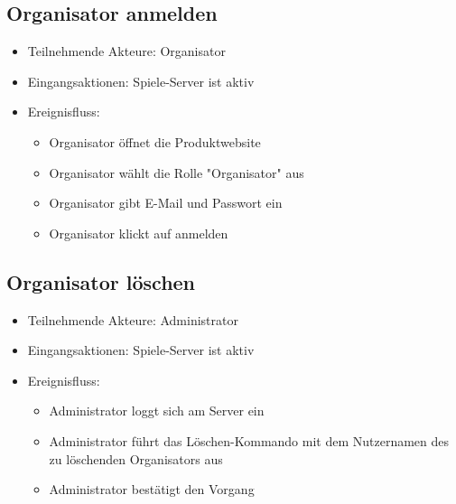 \documentclass[a4paper]{scrreprt}
\begin{document}
    \subsection{Organisator anmelden}
    \begin{itemize}
        \item Teilnehmende Akteure: \Gls{Organisator}
        \item Eingangsaktionen: Spiele-Server ist aktiv
        \item Ereignisfluss:
        \begin{itemize}
            \item \Gls{Organisator} öffnet die Produktwebsite
            \item \Gls{Organisator} wählt die Rolle "\Gls{Organisator}" aus
            \item \Gls{Organisator} gibt E-Mail und Passwort ein
            \item \Gls{Organisator} klickt auf anmelden
        \end{itemize}
    \end{itemize}

    \subsection{Organisator löschen}
    \begin{itemize}
        \item Teilnehmende Akteure: \Gls{Administrator}
        \item Eingangsaktionen: Spiele-Server ist aktiv
        \item Ereignisfluss:
        \begin{itemize}
            \item \Gls{Administrator} loggt sich am Server ein
            \item \Gls{Administrator} führt das Löschen-Kommando mit dem Nutzernamen des zu löschenden \Gls{Organisator}s aus
            \item \Gls{Administrator} bestätigt den Vorgang
        \end{itemize}
    \end{itemize}
\end{document}

